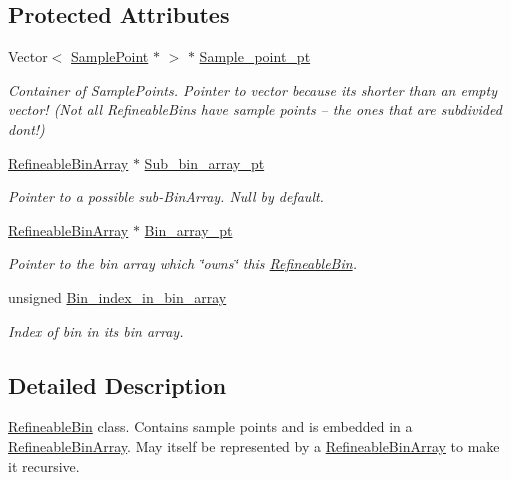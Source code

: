 \subsection*{Protected Attributes}
\begin{DoxyCompactItemize}
\item 
Vector$<$ \hyperlink{classSamplePoint}{Sample\+Point} $\ast$ $>$ $\ast$ \hyperlink{classRefineableBin_a9d0241fb089b4bb2e50e0ab435ebd6ba}{Sample\+\_\+point\+\_\+pt}
\begin{DoxyCompactList}\small\item\em Container of Sample\+Points. Pointer to vector because it\textquotesingle{}s shorter than an empty vector! (Not all Refineable\+Bins have sample points -- the ones that are subdivided don\textquotesingle{}t!) \end{DoxyCompactList}\item 
\hyperlink{classRefineableBinArray}{Refineable\+Bin\+Array} $\ast$ \hyperlink{classRefineableBin_a6ef2b185fee14608f5adc423b266e1f7}{Sub\+\_\+bin\+\_\+array\+\_\+pt}
\begin{DoxyCompactList}\small\item\em Pointer to a possible sub-\/\+Bin\+Array. Null by default. \end{DoxyCompactList}\item 
\hyperlink{classRefineableBinArray}{Refineable\+Bin\+Array} $\ast$ \hyperlink{classRefineableBin_ad79b9df93c7be0cd54933f182037db20}{Bin\+\_\+array\+\_\+pt}
\begin{DoxyCompactList}\small\item\em Pointer to the bin array which \char`\"{}owns\char`\"{} this \hyperlink{classRefineableBin}{Refineable\+Bin}. \end{DoxyCompactList}\item 
unsigned \hyperlink{classRefineableBin_a7714484b072bdc7466d3d24024588f1f}{Bin\+\_\+index\+\_\+in\+\_\+bin\+\_\+array}
\begin{DoxyCompactList}\small\item\em Index of bin in its bin array. \end{DoxyCompactList}\end{DoxyCompactItemize}


\subsection{Detailed Description}
\hyperlink{classRefineableBin}{Refineable\+Bin} class. Contains sample points and is embedded in a \hyperlink{classRefineableBinArray}{Refineable\+Bin\+Array}. May itself be represented by a \hyperlink{classRefineableBinArray}{Refineable\+Bin\+Array} to make it recursive. 

